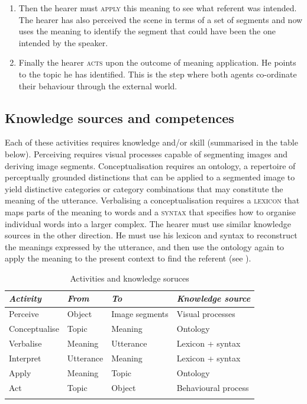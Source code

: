 \begin{enumerate}
\item Then the hearer must {\scshape apply} this meaning
to see what referent was intended. The hearer has
also perceived the scene in terms of a set of 
segments and now uses 
the meaning to identify the segment that
could have been the one intended by the speaker.

\item Finally the hearer {\scshape acts} upon the outcome of meaning
application. He points to the topic he has identified. This is the 
step where both agents co-ordinate their 
behaviour through the external world. 
\end{enumerate}

\subsection{Knowledge sources and competences}

Each of these activities requires knowledge and/or skill
(summarised in the table below). Perceiving requires 
visual processes capable of segmenting images and deriving image 
segments. Conceptualisation requires an ontology, 
a repertoire of perceptually grounded distinctions
that can be applied to a segmented image to yield 
distinctive categories or category combinations that 
may constitute the meaning of the utterance. Verbalising 
a conceptualisation requires 
a {\scshape lexicon} that maps parts of the meaning to words and 
a {\scshape syntax} that specifies how to organise individual words
into a larger complex. 
The hearer must use similar 
knowledge sources in the other direction. He must use 
his lexicon and syntax to reconstruct the meanings expressed
by the utterance, and then use the 
ontology again to apply the meaning to the present 
context to find the referent (see ).


\begin{table}[htbp]
\caption{Activities and knowledge soruces}
\label{tab:2:findthereferent}
\begin{tabular}{ l  l  l  l }
\lsptoprule
{\itshape Activity} & {\itshape From} & {\itshape To} & {\itshape Knowledge source}\\ \midrule
Perceive & Object & Image segments & Visual processes \\ 
Conceptualise & Topic & Meaning & Ontology  \\ 
Verbalise & Meaning & Utterance & Lexicon + syntax \\  
Interpret & Utterance & Meaning & Lexicon + syntax \\ 
Apply & Meaning & Topic & Ontology \\ 
Act & Topic & Object & Behavioural process  \\ 
\lspbottomrule
\end{tabular}
\end{table}

